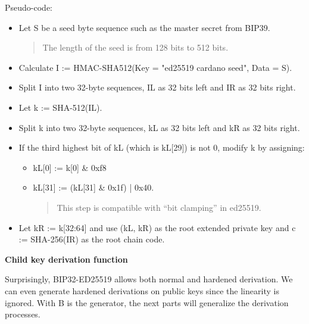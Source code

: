 Pseudo-code:
\begin{itemize}
    \item Let S be a seed byte sequence such as the master secret from BIP39.
          \begin{quote}
              The length of the seed is from 128 bits to 512 bits.
          \end{quote}
          \bigskip

    \item Calculate I := HMAC-SHA512(Key = "ed25519 cardano seed", Data = S).
          \bigskip
    \item Split I into two 32-byte sequences, IL as 32 bits left and IR as 32 bits right.
          \bigskip

    \item Let k := SHA-512(IL).
          \bigskip
    \item Split k into two 32-byte sequences, kL as 32 bits left and kR as 32 bits right.
          \bigskip
    \item If the third highest bit of kL (which is kL[29]) is not 0, modify k by assigning:
          \begin{itemize}
              \item kL[0] := k[0] \& 0xf8
              \item kL[31] := (kL[31] \& 0x1f) | 0x40.
                    \begin{quote}
                        This step is compatible with “bit clamping” in ed25519.
                    \end{quote}
          \end{itemize}
          \bigskip
    \item Let kR := k[32:64] and use (kL, kR) as the root extended private key and c := SHA-256(IR) as the root chain code.
\end{itemize}

\bigskip
{\textbf{Child key derivation function}}

Surprisingly, BIP32-ED25519 allows both normal and hardened derivation. We can even generate hardened derivations on public keys since the linearity is ignored. With B is the generator, the next parts will generalize the derivation processes.

